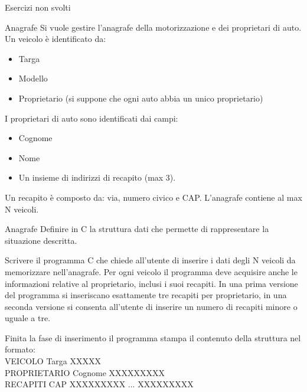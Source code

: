 \documentclass[aspectratio=169,]{beamer}
\begin{document}
\begin{frame}
    \alert{Esercizi non svolti}
\end{frame}


\begin{frame}{Anagrafe}
    Si vuole gestire l’anagrafe della motorizzazione e dei proprietari di auto. Un veicolo è identificato da:
    \begin{itemize}
        \item Targa
        \item Modello
        \item Proprietario (si suppone che ogni auto abbia un unico proprietario)
    \end{itemize}

    I proprietari di auto sono identificati dai campi:
    \begin{itemize}
        \item Cognome
        \item Nome
        \item Un insieme di indirizzi di recapito (max 3).
    \end{itemize}

    Un recapito è composto da: via, numero civico e CAP. L’anagrafe contiene al max N veicoli.
\end{frame}

{
    \small
    \begin{frame}{Anagrafe}
        Definire in C la struttura dati che permette di rappresentare la situazione descritta.

        Scrivere il programma C che chiede all’utente di inserire i dati degli N veicoli da memorizzare
        nell’anagrafe. Per ogni veicolo il programma deve acquisire anche le informazioni relative al
        proprietario, inclusi i suoi recapiti. In una prima versione del programma si inseriscano esattamente
        tre recapiti per proprietario, in una seconda versione si consenta all’utente di inserire un numero di
        recapiti minore o uguale a tre.

        Finita la fase di inserimento il programma stampa il contenuto della struttura nel formato:\\
        VEICOLO Targa XXXXX \\
        PROPRIETARIO Cognome XXXXXXXXX \\
        RECAPITI CAP XXXXXXXXX ... XXXXXXXXX \\
    \end{frame}
}
\end{document}
